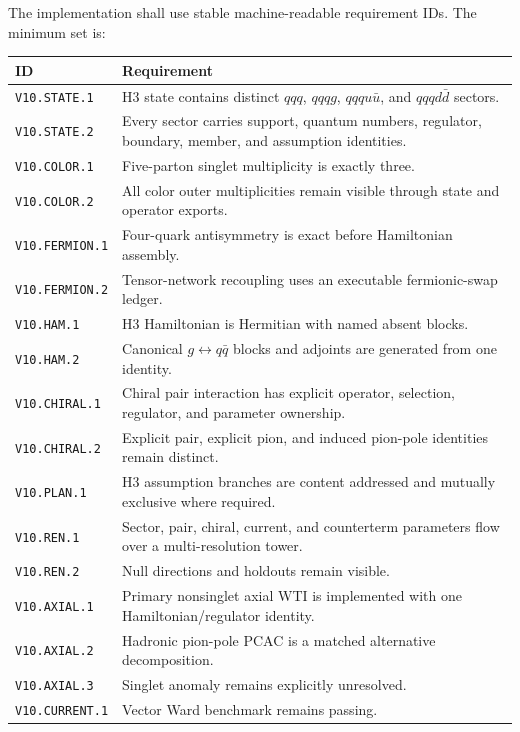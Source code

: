 \documentclass[11pt]{article}
\begin{document}
The implementation shall use stable machine-readable requirement IDs.  The
minimum set is:
\begin{longtable}{L{0.23\textwidth}L{0.69\textwidth}}
\toprule
ID & Requirement\\
\midrule
\endhead
\texttt{V10.STATE.1} & H3 state contains distinct \(qqq\), \(qqqg\),
\(qqqu\bar u\), and \(qqqd\bar d\) sectors.\\
\texttt{V10.STATE.2} & Every sector carries support, quantum numbers,
regulator, boundary, member, and assumption identities.\\
\texttt{V10.COLOR.1} & Five-parton singlet multiplicity is exactly three.\\
\texttt{V10.COLOR.2} & All color outer multiplicities remain visible through
state and operator exports.\\
\texttt{V10.FERMION.1} & Four-quark antisymmetry is exact before Hamiltonian
assembly.\\
\texttt{V10.FERMION.2} & Tensor-network recoupling uses an executable
fermionic-swap ledger.\\
\texttt{V10.HAM.1} & H3 Hamiltonian is Hermitian with named absent blocks.\\
\texttt{V10.HAM.2} & Canonical \(g\leftrightarrow q\bar q\) blocks and
adjoints are generated from one identity.\\
\texttt{V10.CHIRAL.1} & Chiral pair interaction has explicit operator,
selection, regulator, and parameter ownership.\\
\texttt{V10.CHIRAL.2} & Explicit pair, explicit pion, and induced pion-pole
identities remain distinct.\\
\texttt{V10.PLAN.1} & H3 assumption branches are content addressed and
mutually exclusive where required.\\
\texttt{V10.REN.1} & Sector, pair, chiral, current, and counterterm parameters
flow over a multi-resolution tower.\\
\texttt{V10.REN.2} & Null directions and holdouts remain visible.\\
\texttt{V10.AXIAL.1} & Primary nonsinglet axial WTI is implemented with one
Hamiltonian/regulator identity.\\
\texttt{V10.AXIAL.2} & Hadronic pion-pole PCAC is a matched alternative
decomposition.\\
\texttt{V10.AXIAL.3} & Singlet anomaly remains explicitly unresolved.\\
\texttt{V10.CURRENT.1} & Vector Ward benchmark remains passing.\\

\end{longtable}
\end{document}
